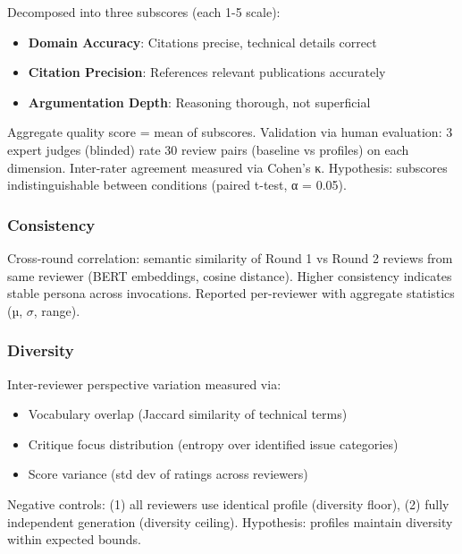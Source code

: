 Decomposed into three subscores (each 1-5 scale):

\begin{itemize}
\item \textbf{Domain Accuracy}: Citations precise, technical details correct
\item \textbf{Citation Precision}: References relevant publications accurately
\item \textbf{Argumentation Depth}: Reasoning thorough, not superficial
\end{itemize}

Aggregate quality score = mean of subscores. Validation via human evaluation: 3 expert judges (blinded) rate 30 review pairs (baseline vs profiles) on each dimension. Inter-rater agreement measured via Cohen's κ. Hypothesis: subscores indistinguishable between conditions (paired t-test, α = 0.05).

\subsubsection{Consistency}

Cross-round correlation: semantic similarity of Round 1 vs Round 2 reviews from same reviewer (BERT embeddings, cosine distance). Higher consistency indicates stable persona across invocations. Reported per-reviewer with aggregate statistics (µ, $\sigma$, range).

\subsubsection{Diversity}

Inter-reviewer perspective variation measured via:
\begin{itemize}
\item Vocabulary overlap (Jaccard similarity of technical terms)
\item Critique focus distribution (entropy over identified issue categories)
\item Score variance (std dev of ratings across reviewers)
\end{itemize}

Negative controls: (1) all reviewers use identical profile (diversity floor), (2) fully independent generation (diversity ceiling). Hypothesis: profiles maintain diversity within expected bounds.
